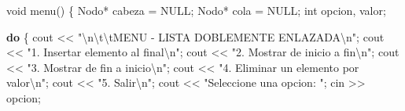 \documentclass[
  11pt,
  a4paper,
  DIV=11,
  numbers=noendperiod]{scrreprt}
\newenvironment{Shaded}{\begin{snugshade}}{\end{snugshade}}
\newcommand{\ControlFlowTok}[1]{\textcolor[rgb]{0.00,0.23,0.31}{\textbf{#1}}}
\newcommand{\DataTypeTok}[1]{\textcolor[rgb]{0.68,0.00,0.00}{#1}}
\newcommand{\NormalTok}[1]{\textcolor[rgb]{0.00,0.23,0.31}{#1}}
\newcommand{\OperatorTok}[1]{\textcolor[rgb]{0.37,0.37,0.37}{#1}}
\newcommand{\SpecialCharTok}[1]{\textcolor[rgb]{0.37,0.37,0.37}{#1}}
\newcommand{\StringTok}[1]{\textcolor[rgb]{0.13,0.47,0.30}{#1}}
\begin{document}
\begin{Shaded}
\begin{Highlighting}[]
\DataTypeTok{void}\NormalTok{ menu}\OperatorTok{()} \OperatorTok{\{}
\NormalTok{    Nodo}\OperatorTok{*}\NormalTok{ cabeza }\OperatorTok{=}\NormalTok{ NULL}\OperatorTok{;}
\NormalTok{    Nodo}\OperatorTok{*}\NormalTok{ cola }\OperatorTok{=}\NormalTok{ NULL}\OperatorTok{;}
    \DataTypeTok{int}\NormalTok{ opcion}\OperatorTok{,}\NormalTok{ valor}\OperatorTok{;}

    \ControlFlowTok{do} \OperatorTok{\{}
\NormalTok{        cout }\OperatorTok{\textless{}\textless{}} \StringTok{"}\SpecialCharTok{\textbackslash{}n\textbackslash{}t\textbackslash{}t}\StringTok{MENU {-} LISTA DOBLEMENTE ENLAZADA}\SpecialCharTok{\textbackslash{}n}\StringTok{"}\OperatorTok{;}
\NormalTok{        cout }\OperatorTok{\textless{}\textless{}} \StringTok{"1. Insertar elemento al final}\SpecialCharTok{\textbackslash{}n}\StringTok{"}\OperatorTok{;}
\NormalTok{        cout }\OperatorTok{\textless{}\textless{}} \StringTok{"2. Mostrar de inicio a fin}\SpecialCharTok{\textbackslash{}n}\StringTok{"}\OperatorTok{;}
\NormalTok{        cout }\OperatorTok{\textless{}\textless{}} \StringTok{"3. Mostrar de fin a inicio}\SpecialCharTok{\textbackslash{}n}\StringTok{"}\OperatorTok{;}
\NormalTok{        cout }\OperatorTok{\textless{}\textless{}} \StringTok{"4. Eliminar un elemento por valor}\SpecialCharTok{\textbackslash{}n}\StringTok{"}\OperatorTok{;}
\NormalTok{        cout }\OperatorTok{\textless{}\textless{}} \StringTok{"5. Salir}\SpecialCharTok{\textbackslash{}n}\StringTok{"}\OperatorTok{;}
\NormalTok{        cout }\OperatorTok{\textless{}\textless{}} \StringTok{"Seleccione una opcion: "}\OperatorTok{;}
\NormalTok{        cin }\OperatorTok{\textgreater{}\textgreater{}}\NormalTok{ opcion}\OperatorTok{;}


\end{Highlighting}
\end{Shaded}
\end{document}
